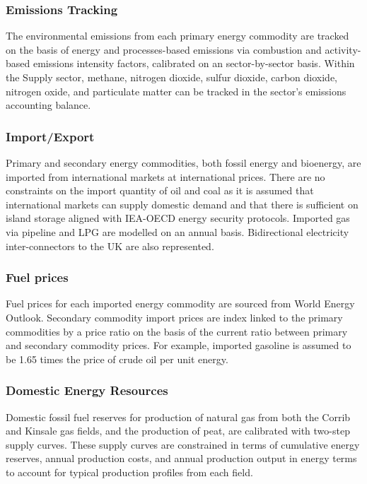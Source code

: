 \documentclass[gmd,manuscript]{copernicus}
\begin{document}
\subsubsection{Emissions Tracking}
The environmental emissions from each primary energy commodity are tracked on the basis of energy and processes-based emissions via combustion and activity-based emissions intensity factors, calibrated on an sector-by-sector basis. Within the Supply sector, methane, nitrogen dioxide, sulfur dioxide, carbon dioxide, nitrogen oxide, and particulate matter can be tracked in the sector's emissions accounting balance.

\subsubsection{Import/Export}
Primary and secondary energy commodities, both fossil energy and bioenergy, are imported from international markets at international prices. There are no constraints on the import quantity of oil and coal as it is assumed that international markets can supply domestic demand and that there is sufficient on island storage aligned with IEA-OECD energy security protocols. Imported gas via pipeline and LPG are modelled on an annual basis. Bidirectional electricity inter-connectors to the UK are also represented.

\subsubsection{Fuel prices}
Fuel prices for each imported energy commodity are sourced from \citet{IEA2019,InternationalEnergyAgency2020} World Energy Outlook. Secondary commodity import prices are index linked to the primary commodities by a price ratio on the basis of the current ratio between primary and secondary commodity prices. For example, imported gasoline is assumed to be 1.65 times the price of crude oil per unit energy.


\subsubsection{Domestic Energy Resources}
Domestic fossil fuel reserves for production of natural gas from both the Corrib and Kinsale gas fields, and the production of peat, are calibrated with two-step supply curves. These supply curves are constrained in terms of cumulative energy reserves, annual production costs, and annual production output in energy terms to account for typical production profiles from each field.
\end{document}
